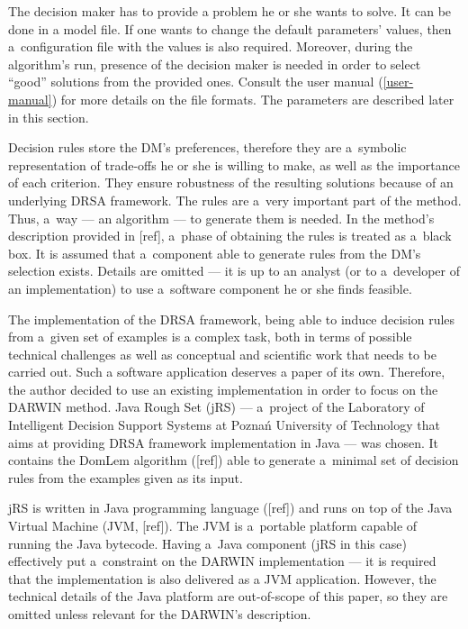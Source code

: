 The decision maker has to provide a problem he or she wants to solve. It can
be done in a model file. If one wants to change the default parameters'
values, then a~configuration file with the values is also required. Moreover,
during the algorithm's run, presence of the decision maker is needed in order
to select ``good'' solutions from the provided ones. Consult the user manual
(\ref{user-manual}) for more details on the file formats. The parameters are
described later in this section.

Decision rules store the DM's preferences, therefore they are a~symbolic
representation of trade-offs he or she is willing to make, as well as the
importance of each criterion. They ensure robustness of the resulting
solutions because of an underlying DRSA framework. The rules are a~very
important part of the method. Thus, a~way --- an algorithm --- to generate
them is needed. In the method's description provided in [ref], a~phase of
obtaining the rules is treated as a~black box. It is assumed that a~component
able to generate rules from the DM's selection exists. Details are omitted ---
it is up to an analyst (or to a~developer of an implementation) to use
a~software component he or she finds feasible.

The implementation of the DRSA framework, being able to induce decision rules
from a~given set of examples is a complex task, both in terms of possible
technical challenges as well as conceptual and scientific work that needs to
be carried out. Such a software application deserves a paper of its
own. Therefore, the author decided to use an existing implementation in order
to focus on the DARWIN method. Java Rough Set (jRS) --- a~project of the
Laboratory of Intelligent Decision Support Systems at Poznań University of
Technology that aims at providing DRSA framework implementation in Java ---
was chosen. It contains the DomLem algorithm ([ref]) able to generate
a~minimal set of decision rules from the examples given as its input.

jRS is written in Java programming language ([ref]) and runs on top of the
Java Virtual Machine (JVM, [ref]). The JVM is a~portable platform capable of
running the Java bytecode. Having a~Java component (jRS in this case)
effectively put a~constraint on the DARWIN implementation --- it is required
that the implementation is also delivered as a JVM application. However, the
technical details of the Java platform are out-of-scope of this paper, so they
are omitted unless relevant for the DARWIN's description.

